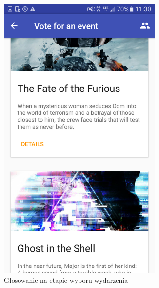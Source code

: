 \documentclass[10pt,a4paper]{article}
\begin{document}
\begin{figure}
	\begin{subfigure}[t]{0.4\textwidth}
		\centering
		\includegraphics[width=0.9\textwidth]{screen3.png}
		\caption{Głosowanie na etapie wyboru wydarzenia}
	\end{subfigure}
	\hfill
	\begin{subfigure}[t]{0.4\textwidth}
		\centering

\end{subfigure}
\end{figure}
\end{document}
